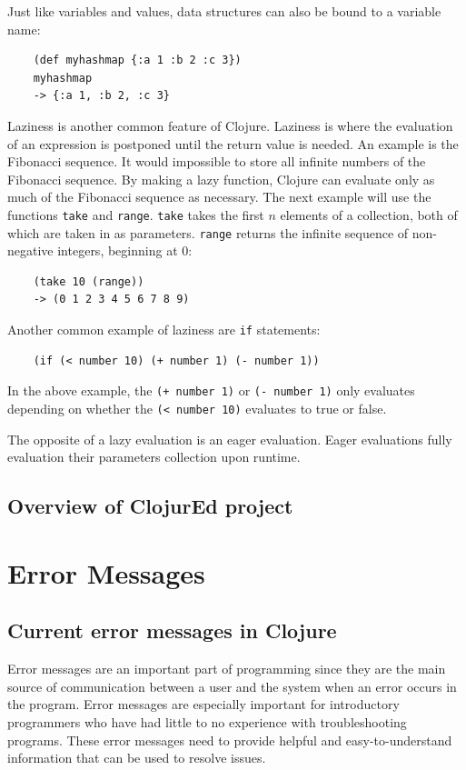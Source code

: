 \documentclass[12pt]{article}
\newcommand{\comment}[1]{{\bf \tt  {#1}}}
\newcommand{\emcomment}[1]{\textcolor{ForestGreen}{\comment{Elena: {#1}}}}
\begin{document}
Just like variables and values, data structures can also be bound to a
variable name: 
\begin{verbatim}
	(def myhashmap {:a 1 :b 2 :c 3})
	myhashmap
	-> {:a 1, :b 2, :c 3}
\end{verbatim}

Laziness is another common feature of Clojure. Laziness is where the evaluation of an expression is
postponed until the return value is needed. An example is the Fibonacci sequence. It would impossible
to store all infinite numbers of the Fibonacci sequence. By making a lazy function, Clojure can
evaluate only as much of the Fibonacci sequence as necessary. The next example will use the functions 
\texttt{take} and \texttt{range}. \texttt{take} takes the first $n$ elements of a collection, both of
which are taken in as parameters. \texttt{range} returns the infinite sequence of non-negative
integers, beginning at 0:
\begin{verbatim}
	(take 10 (range))
	-> (0 1 2 3 4 5 6 7 8 9)
\end{verbatim}

Another common example of laziness are \texttt{if} statements:

\begin{verbatim}
	(if (< number 10) (+ number 1) (- number 1))
\end{verbatim}

In the above example, the \texttt{(+ number 1)} or \texttt{(- number 1)} only evaluates depending on
whether the \texttt{(< number 10)} evaluates to true or false.

The opposite of a lazy evaluation is an eager evaluation. Eager evaluations fully evaluation their
parameters collection upon runtime.


\subsection{Overview of ClojurEd project}\label{sec:project}



\section{Error Messages}\label{sec:errors}

\subsection{Current error messages in Clojure}\label{sec:currentem}
Error messages are an important part of programming since they are the main source of communication between a user and the system when an error occurs in the program.
Error messages are especially important for introductory programmers who have had little to no experience with troubleshooting programs. %
These error messages need to provide helpful and easy-to-understand information that can be used to resolve issues.
\end{document}
